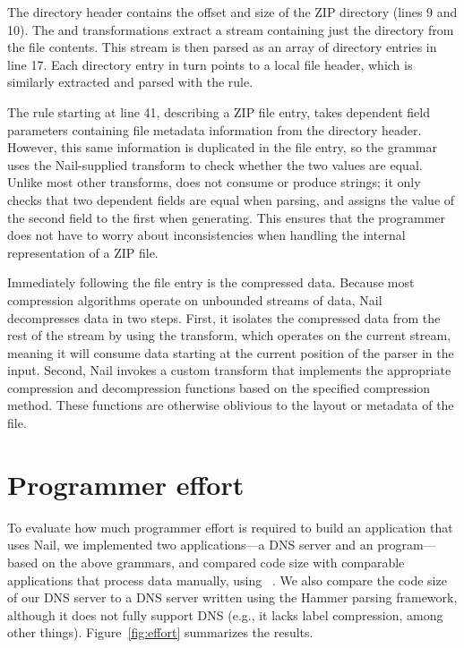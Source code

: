 The directory header contains the offset and size of the ZIP
directory (lines 9 and 10). The  and 
transformations extract a stream containing just the directory from
the file contents. This stream is then parsed as an array of directory
entries in line 17.
Each directory entry in turn points to a local file header, which is
similarly extracted and parsed with the  rule.

The  rule starting at line 41, describing a ZIP file entry,
takes dependent field
parameters containing file metadata information from the directory
header. However, this same information is duplicated in the file
entry, so the grammar uses the Nail-supplied 
transform to check whether the two values are equal. Unlike most other
transforms,  does not consume or produce strings; it
only checks that two dependent fields are equal when parsing, and
assigns the value of the second field to the first when generating.
This ensures that the programmer does not have to worry about
inconsistencies when handling the internal representation of a ZIP
file.

Immediately following the file entry is the compressed data.  Because
most compression algorithms operate on unbounded streams of data, Nail
decompresses data in two steps.  First, it isolates the compressed
data from the rest of the stream by using the  transform,
which operates on the current stream, meaning it will consume data
starting at the current position of the parser in the input.  Second,
Nail invokes a custom  transform that implements
the appropriate compression and decompression functions based on the
specified compression method. These functions are otherwise oblivious
to the layout or metadata of the file.


\section{Programmer effort}
\label{s:eval-effort}


To evaluate how much programmer effort is required to build an
application that uses Nail, we implemented two applications---a
DNS server and an
 program---based on the above grammars, and compared code
size with comparable applications that process data manually, using
~\cite{sloccount}.  We also compare the code size of our
DNS server to a DNS server written using the Hammer parsing framework,
although it does not fully support DNS (e.g., it lacks label compression,
among other things).  Figure~\ref{fig:effort} summarizes the results.

